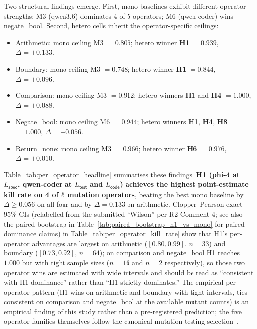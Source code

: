 Two structural findings emerge. First, mono baselines exhibit different operator strengths: M3 (qwen3.6) dominates 4 of 5 operators; M6 (qwen-coder) wins negate\_bool. Second, hetero cells inherit the operator-specific ceilings:

\begin{itemize}
  \item Arithmetic: mono ceiling M3 $= 0.806$; hetero winner \textbf{H1} $= 0.939$, $\Delta = +0.133$.
  \item Boundary: mono ceiling M3 $= 0.748$; hetero winner \textbf{H1} $= 0.844$, $\Delta = +0.096$.
  \item Comparison: mono ceiling M3 $= 0.912$; hetero winners \textbf{H1} and \textbf{H4} $= 1.000$, $\Delta = +0.088$.
  \item Negate\_bool: mono ceiling M6 $= 0.944$; hetero winners \textbf{H1}, \textbf{H4}, \textbf{H8} $= 1.000$, $\Delta = +0.056$.
  \item Return\_none: mono ceiling M3 $= 0.966$; hetero winner \textbf{H6} $= 0.976$, $\Delta = +0.010$.
\end{itemize}



Table~\ref{tab:per_operator_headline} summarises these findings. \textbf{H1 (phi-4 at $L_{\textsf{spec}}$, qwen-coder at $L_{\textsf{test}}$ and $L_{\textsf{code}}$) achieves the highest point-estimate kill rate on 4 of 5 mutation operators}, beating the best mono baseline by $\Delta \geq 0.056$ on all four and by $\Delta = 0.133$ on arithmetic. Clopper--Pearson exact 95\% CIs (relabelled from the submitted ``Wilson'' per R2 Comment 4; see also the paired bootstrap in Table~\ref{tab:paired_bootstrap_h1_vs_mono} for paired-dominance claims) in Table~\ref{tab:per_operator_kill_rate} show that H1's per-operator advantages are largest on arithmetic ($[0.80, 0.99]$, $n = 33$) and boundary ($[0.73, 0.92]$, $n = 64$); on comparison and negate\_bool H1 reaches $1.000$ but with tight sample sizes ($n = 16$ and $n = 2$ respectively), so those two operator wins are estimated with wide intervals and should be read as ``consistent with H1 dominance'' rather than ``H1 strictly dominates.'' The empirical per-operator pattern (H1 wins on arithmetic and boundary with tight intervals, ties-consistent on comparison and negate\_bool at the available mutant counts) is an empirical finding of this study rather than a pre-registered prediction; the five operator families themselves follow the canonical mutation-testing selection~\citep{Andrews2005MutationAnalysis, Just2014MutationAnalysis}.


